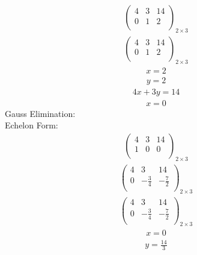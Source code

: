 \documentclass{article}
\begin{document}
\begin{align*}
\left(
\begin{array}{cc|c}
4 & 3 & 14\\
0 & 1 & 2\\
\end{array}
\right)_{2\times 3}
\end{align*}
\begin{align*}
\left(
\begin{array}{cc|c}
4 & 3 & 14\\
0 & 1 & 2\\
\end{array}
\right)_{2\times 3}
\end{align*}
\begin{align*}
x=2\end{align*}
\begin{align*}
y=2\end{align*}
\begin{align*}
4x + 3y=14\end{align*}
\begin{align*}
x=0\end{align*}
Gauss Elimination:\\
Echelon Form:\\
\begin{align*}
\left(
\begin{array}{cc|c}
4 & 3 & 14\\
1 & 0 & 0\\
\end{array}
\right)_{2\times 3}
\end{align*}
\begin{align*}
\left(
\begin{array}{cc|c}
4 & 3 & 14\\
0 & -\frac{3}{4} & -\frac{7}{2}\\
\end{array}
\right)_{2\times 3}
\end{align*}
\begin{align*}
\left(
\begin{array}{cc|c}
4 & 3 & 14\\
0 & -\frac{3}{4} & -\frac{7}{2}\\
\end{array}
\right)_{2\times 3}
\end{align*}
\begin{align*}
x=0\end{align*}
\begin{align*}
y=\frac{14}{3}\end{align*}
\end{document}
